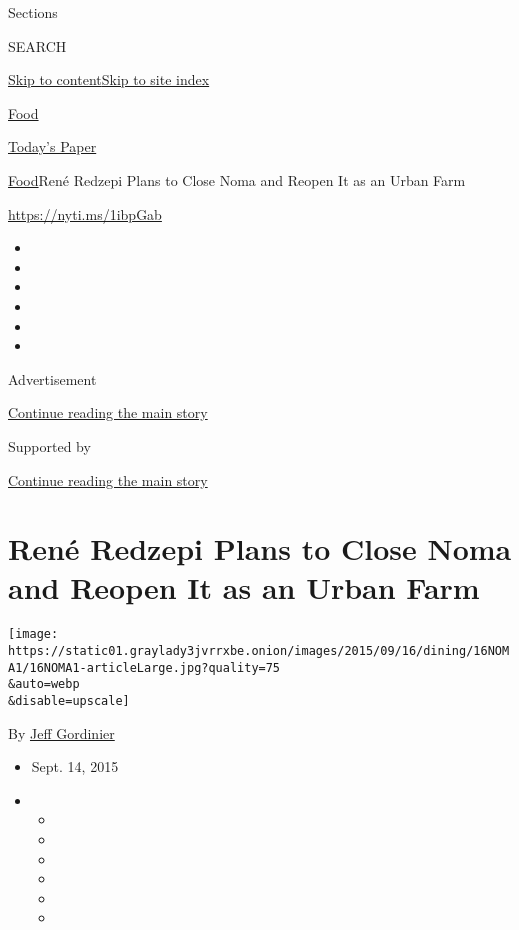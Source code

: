 Sections

SEARCH

\protect\hyperlink{site-content}{Skip to
content}\protect\hyperlink{site-index}{Skip to site index}

\href{https://www.nytimes3xbfgragh.onion/section/food}{Food}

\href{https://myaccount.nytimes3xbfgragh.onion/auth/login?response_type=cookie\&client_id=vi}{}

\href{https://www.nytimes3xbfgragh.onion/section/todayspaper}{Today's
Paper}

\href{/section/food}{Food}\textbar{}René Redzepi Plans to Close Noma and
Reopen It as an Urban Farm

\url{https://nyti.ms/1ibpGab}

\begin{itemize}
\item
\item
\item
\item
\item
\item
\end{itemize}

Advertisement

\protect\hyperlink{after-top}{Continue reading the main story}

Supported by

\protect\hyperlink{after-sponsor}{Continue reading the main story}

\hypertarget{renuxe9-redzepi-plans-to-close-noma-and-reopen-it-as-an-urban-farm}{%
\section{René Redzepi Plans to Close Noma and Reopen It as an Urban
Farm}\label{renuxe9-redzepi-plans-to-close-noma-and-reopen-it-as-an-urban-farm}}

\texttt{[image: https://static01.graylady3jvrrxbe.onion/images/2015/09/16/dining/16NOMA1/16NOMA1-articleLarge.jpg?quality=75\\\&auto=webp\\\&disable=upscale]}

By \href{https://www.nytimes3xbfgragh.onion/by/jeff-gordinier}{Jeff
Gordinier}

\begin{itemize}
\item
  Sept. 14, 2015
\item
  \begin{itemize}
  \item
  \item
  \item
  \item
  \item
  \item
  \end{itemize}
\end{itemize}

